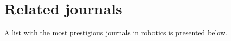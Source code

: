 



\section{Related journals}

A list with the most prestigious journals in robotics is presented below.

